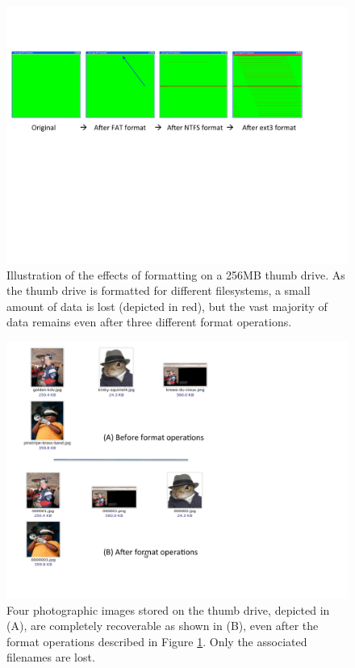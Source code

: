 \begin{figure}[ht]
\centering
\includegraphics[width=150mm]{ch-carving/formatting.pdf}
\caption{Illustration of the effects of formatting on a 256MB thumb drive.  As the thumb drive is formatted for different filesystems, a small amount of data is lost (depicted in red), but the vast majority of data remains even after three different format operations.}
\label{fig:formatting}
\end{figure}


\begin{figure}[ht]
\centering
\includegraphics[width=150mm]{ch-carving/recovered.pdf}
\caption{Four photographic images stored on the thumb drive, depicted in (A), are completely recoverable as shown in (B), even after the format operations described in Figure \ref{fig:formatting}.  Only the associated filenames are lost.}
\label{fig:recovered}
\end{figure}



